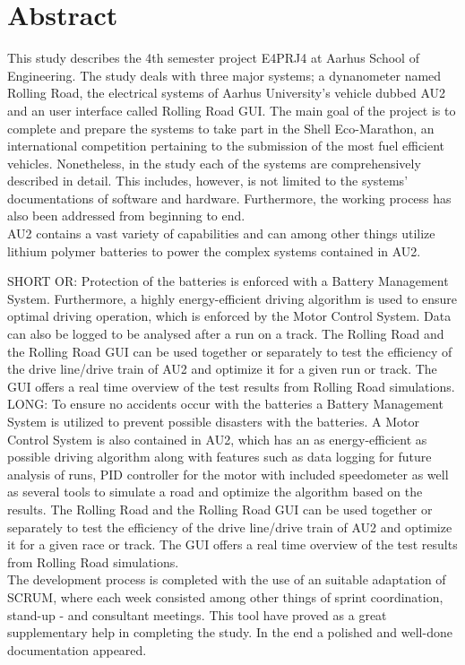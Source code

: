 \chapter{Abstract}
This study describes the 4th semester project E4PRJ4 at Aarhus School of Engineering. The study deals with three major systems; a dynanometer named Rolling Road, the electrical systems of Aarhus University's vehicle dubbed AU2 and an user interface called Rolling Road GUI. The main goal of the project is to complete and prepare the systems to take part in the Shell Eco-Marathon, an international competition pertaining to the submission of the most fuel efficient vehicles. Nonetheless, in the study each of the systems are comprehensively described in detail. This includes, however, is not limited to the systems' documentations of  software and hardware. Furthermore, the working process has also been addressed from beginning to end. \\
AU2 contains a vast variety of capabilities and can among other things utilize lithium polymer batteries to power the complex systems contained in AU2.

SHORT OR:
Protection of the batteries is enforced with a Battery Management System. Furthermore, a highly energy-efficient driving algorithm is used to ensure optimal driving operation, which is enforced by the Motor Control System. Data can also be logged to be analysed after a run on a track.
The Rolling Road and the Rolling Road GUI can be used together or separately to test the efficiency of the drive line/drive train of AU2 and optimize it for a given run or track. The GUI offers a real time overview of the test results from Rolling Road simulations.\\

LONG:
To ensure no accidents occur with the batteries a Battery Management System is utilized to prevent possible disasters with the batteries. A Motor Control System is also contained in AU2, which has an as energy-efficient as possible driving algorithm along with features such as data logging for future analysis of runs, PID controller for the motor with included speedometer as well as several tools to simulate a road and optimize the algorithm based on the results. The Rolling Road and the Rolling Road GUI can be used together or separately to test the efficiency of the drive line/drive train of AU2 and optimize it for a given race or track. The GUI offers a real time overview of the test results from Rolling Road simulations.\\

The development process is completed with the use of an suitable adaptation of SCRUM, where each week consisted among other things of sprint coordination, stand-up - and consultant meetings. This tool have proved as a great
supplementary help in completing the study. In the end a polished and well-done documentation appeared.